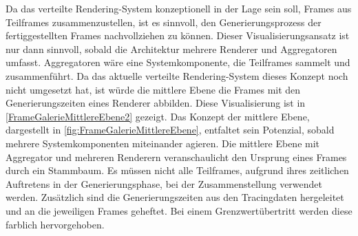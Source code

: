Da das verteilte Rendering-System konzeptionell in der Lage sein soll, Frames aus Teilframes zusammenzustellen, ist es sinnvoll, den Generierungsprozess der fertiggestellten Frames nachvollziehen zu können. Dieser Visualisierungsansatz ist nur dann sinnvoll, sobald die Architektur mehrere Renderer und Aggregatoren umfasst. Aggregatoren wäre eine Systemkomponente, die Teilframes sammelt und zusammenführt. Da das aktuelle verteilte Rendering-System dieses Konzept noch nicht umgesetzt hat, ist würde die mittlere Ebene die Frames mit den Generierungszeiten eines Renderer abbilden. Diese Visualisierung ist in \cref{FrameGalerieMittlereEbene2} gezeigt. Das Konzept der mittlere Ebene, dargestellt in \cref{fig:FrameGalerieMittlereEbene}, entfaltet sein Potenzial, sobald mehrere Systemkomponenten miteinander agieren. Die mittlere Ebene mit Aggregator und mehreren Renderern veranschaulicht den Ursprung eines Frames durch ein Stammbaum. Es müssen nicht alle Teilframes, aufgrund ihres zeitlichen Auftretens in der Generierungsphase, bei der Zusammenstellung verwendet werden. Zusätzlich sind die Generierungszeiten aus den Tracingdaten hergeleitet und an die jeweiligen Frames geheftet. Bei einem Grenzwertübertritt werden diese farblich hervorgehoben.

